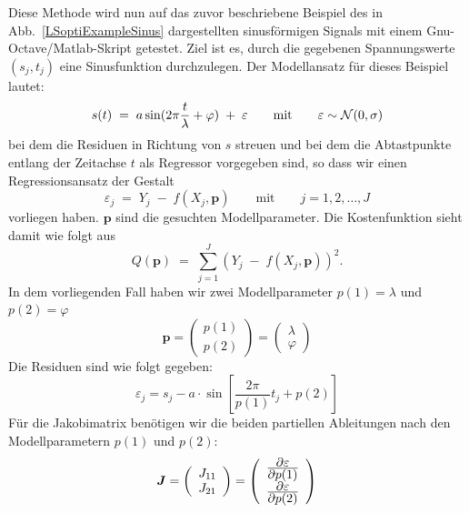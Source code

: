 Diese Methode wird nun auf das zuvor beschriebene Beispiel des in Abb.~\ref{LSoptiExampleSinus}
dargestellten sinusförmigen Signals mit einem Gnu-Octave/Matlab-Skript getestet.
Ziel ist es, durch die gegebenen Spannungswerte $(s_j,t_j)$ eine Sinusfunktion
durchzulegen. Der Modellansatz für dieses Beispiel lautet:
\begin{equation}
	s(t) \; = \; a \sin(2\pi \frac{t}{\lambda} + \varphi) \; + \; \varepsilon \qquad
	\textrm{mit} \qquad \varepsilon \sim {\cal N}(0,\sigma)
\end{equation}
bei dem die Residuen in Richtung von $s$ streuen und bei dem die Abtastpunkte
entlang der Zeitachse $t$ als Regressor vorgegeben sind, so dass
wir einen Regressionsansatz der Gestalt
\begin{equation}
	\varepsilon_j \; = \; Y_j \; - \; f(X_j, \boldsymbol{p}) \qquad \textrm{mit} \qquad
	j=1, 2,\dots, J
\end{equation}
vorliegen haben. $\boldsymbol{p}$ sind die gesuchten Modellparameter. Die Kostenfunktion sieht damit wie folgt aus
\begin{equation}
	Q(\boldsymbol{p}) \; = \; \sum\limits_{j=1}^J \left(Y_j \; - \; f(X_j, \boldsymbol{p})\right)^2.
\end{equation}
In dem vorliegenden Fall haben wir zwei Modellparameter $p(1) = \lambda$ und $p(2) = \varphi$
\begin{equation}
\boldsymbol{p} =
\left(\begin{array}{c}
	p(1) \\
	p(2)
\end{array}\right)
= \left(\begin{array}{c}
	\lambda \\
	\varphi
\end{array}\right)
\end{equation}
Die Residuen sind wie folgt gegeben:
\begin{equation}
\varepsilon_j = s_j - a \cdot \sin \left[ \frac{2 \pi}{p(1)}t_j +p(2)\right]
\end{equation}
Für die Jakobimatrix benötigen wir die beiden partiellen Ableitungen nach den Modellparametern
$p(1)$ und $p(2)$:
\begin{equation} \boldsymbol{J} =
	\left(	\begin{array}{c} J_{11} \\ J_{21} \end{array}
	\right)
	= \left(
	\begin{array}{c}
		\frac{\displaystyle \partial \varepsilon}{\displaystyle \partial p(1)} \\
		\frac{\displaystyle \partial \varepsilon}{\displaystyle \partial p(2)}
	\end{array}
\right)
\end{equation}

